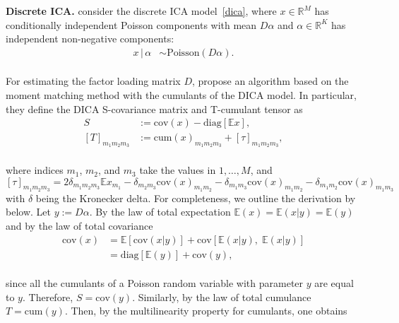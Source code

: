 \documentclass{article}
\newcommand{\ppp}{\textbf}
\newcommand{\sbra}[1]{\left[#1\right]}
\newcommand{\diag}{\mathrm{diag}}
\newcommand{\R}{\mathbb{R}}
\newcommand{\ebb}{\mathbb{E}}
\newcommand{\cov}{\mathrm{cov}}
\newcommand{\cum}{\mathrm{cum}}
\newcommand{\poi}{\mathrm{Poisson}}
\begin{document}
\ppp{Discrete ICA.}
\citet{PodEtAl2015}  consider the discrete ICA model~\eqref{dica}, where $x\in\R^M$ has conditionally independent Poisson components with mean $D\alpha$ and $\alpha\in\R^K$ has independent non-negative components:
\\[-0.8em]
\begin{equation}\label{dica}
\begin{aligned}
x\,|\,\alpha & \sim \poi(D\alpha).
\end{aligned}
\end{equation}
\\[-1.3em]
For estimating the factor loading matrix $D$, \citet{PodEtAl2015} propose an algorithm based on the moment matching method with the cumulants of the DICA model.
In particular, they define the DICA S-covariance matrix and T-cumulant tensor as
\\[-1.5em]
\begin{equation}\label{STdica}
\begin{aligned}
S &:= \cov(x) - \diag\sbra{ \ebb x}, \\
\sbra{T}_{m_1m_2m_3} &:= \cum(x)_{m_1m_2m_3} + [\tau]_{m_1m_2m_3},
\end{aligned}
\end{equation}
\\[-0.9em]
where 
indices $m_1$, $m_2$, and $m_3$ take the values in $1,\dots, M$, and 
$\sbra{ \tau }_{m_1m_2m_3}  = 2\delta_{m_1m_2m_3} \ebb x_{m_1} -\delta_{m_2m_3} \cov(x)_{m_1m_2} - \delta_{m_1m_3} \cov(x)_{m_1m_2} - \delta_{m_1m_2} \cov(x)_{m_1m_3}$
with
 $\delta$ being the Kronecker delta. 
For completeness, we outline the derivation by \citet{PodEtAl2015} below.
Let $y := D\alpha$. By the law of total expectation $\ebb(x) = \ebb(x|y) = \ebb(y)$ and by the law of total covariance
\\[-0.4em]
\vspace{-1.1em}
\begin{equation*}
\begin{aligned}
\cov(x) & = \ebb[ \cov(x|y) ] + \cov[ \ebb(x|y), \; \ebb(x|y) ] \\
& = \diag[ \ebb(y) ] + \cov(y),
\end{aligned}
\end{equation*}
\\[-0.8em]
since all the cumulants of a Poisson random variable with parameter $y$ are equal to $y$.
Therefore, $S = \cov(y)$. Similarly, by the law of total cumulance $T = \cum(y)$.
Then, by the multilinearity property for cumulants, one obtains
\\[-0.8em]
\end{document}
